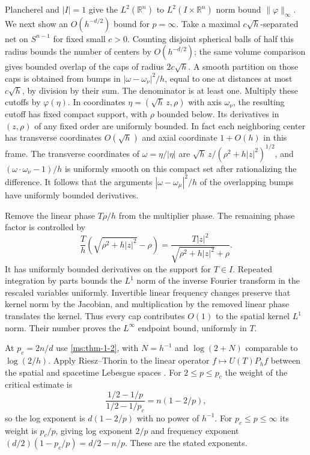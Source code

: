 Plancherel and \(|I|=1\) give the \(L^2(\mathbb R^n)\) to
\(L^2(I\times\mathbb R^n)\) norm bound \(\|\varphi\|_\infty\).
We next show an \(O(h^{-d/2})\) bound for \(p=\infty\).
Take a maximal \(c\sqrt h\)-separated net on \(S^{n-1}\) for
fixed small \(c>0\). Counting disjoint spherical balls of
half this radius bounds the number of centers by
\(O(h^{-d/2})\); the same volume comparison gives bounded
overlap of the caps of radius \(2c\sqrt h\).
A smooth partition on those caps is obtained from bumps in
\(|\omega-\omega_\nu|^2/h\), equal to one at distances at
most \(c\sqrt h\), by division by their sum. The denominator
is at least one. Multiply these cutoffs by \(\varphi(\eta)\).
In coordinates \(\eta=(\sqrt h\,z,\rho)\) with axis
\(\omega_\nu\), the resulting cutoff has fixed compact
support, with \(\rho\) bounded below. Its derivatives in
\((z,\rho)\) of any fixed order are uniformly bounded.
In fact each neighboring center has transverse coordinates
\(O(\sqrt h)\) and axial coordinate \(1+O(h)\) in this frame.
The transverse coordinates of \(\omega=\eta/|\eta|\)
are \(\sqrt h\,z/(\rho^2+h|z|^2)^{1/2}\), and
\((\omega\cdot\omega_\nu-1)/h\) is uniformly smooth on
this compact set after rationalizing the difference.
It follows that the arguments \(|\omega-\omega_\mu|^2/h\)
of the overlapping bumps have uniformly bounded derivatives.

Remove the linear phase \(T\rho/h\) from the multiplier phase.
The remaining phase factor is controlled by
\[
 \frac{T}{h}(\sqrt{\rho^2+h|z|^2}-\rho)
 =\frac{T|z|^2}{\sqrt{\rho^2+h|z|^2}+\rho}.
\]
It has uniformly bounded derivatives on the support for
\(T\in I\). Repeated integration by parts bounds the \(L^1\)
norm of the inverse Fourier transform in the rescaled
variables uniformly. Invertible linear frequency changes
preserve that kernel norm by the Jacobian, and multiplication
by the removed linear phase translates the kernel.
Thus every cap contributes \(O(1)\) to the spatial kernel
\(L^1\) norm. Their number proves the \(L^\infty\) endpoint
bound, uniformly in \(T\).

At \(p_c=2n/d\) use \ref{ms:thm-1-2}, with \(N=h^{-1}\) and
\(\log(2+N)\) comparable to \(\log(2/h)\).
Apply Riesz--Thorin to the linear operator
\(f\mapsto U(T)P_h f\) between the spatial and spacetime
Lebesgue spaces \cite{r-32}. For \(2\le p\le p_c\) the weight
of the critical estimate is
\[
 \frac{1/2-1/p}{1/2-1/p_c}=n(1-2/p),
\]
so the log exponent is \(d(1-2/p)\) with no power of \(h^{-1}\).
For \(p_c\le p\le\infty\) its weight is \(p_c/p\), giving
log exponent \(2/p\) and frequency exponent
\((d/2)(1-p_c/p)=d/2-n/p\). These are the stated exponents.
